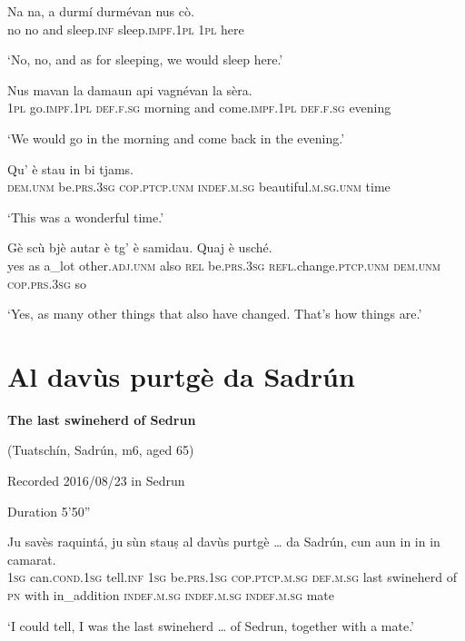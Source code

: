 \begin{linenumbers}
\gll    Na na, a durmí durmévan nus cò. \\
no no and sleep.\textsc{inf} sleep.\textsc{impf.1pl} \textsc{1pl} here \\
\end{linenumbers}
\medskip
\glt `No, no, and as for sleeping, we would sleep here.'
\medskip

\begin{linenumbers}
\gll    Nus mavan la damaun api vagnévan la sèra. \\
 \textsc{1pl} go.\textsc{impf.1pl}  \textsc{def.f.sg} morning and come.\textsc{impf.1pl} \textsc{def.f.sg} evening \\
\end{linenumbers}
\medskip
\glt `We would go in the morning and come back in the evening.'
\medskip

\begin{linenumbers}
\gll    Qu’ è stau in bi tjams. \\
 \textsc{dem.unm} be.\textsc{prs.3sg} \textsc{cop.ptcp.unm} \textsc{indef.m.sg} beautiful.\textsc{m.sg.unm} time\\
\end{linenumbers}
\medskip
\glt `This was a wonderful time.'
\medskip

\largerpage

\begin{linenumbers}
\gll    Gè scù bjè autar è tg’ è samidau. Quaj è usché.\\
yes as a\_lot other.\textsc{adj.unm} also \textsc{rel} be.\textsc{prs.3sg} \textsc{refl.}change.\textsc{ptcp.unm}  \textsc{dem.unm} \textsc{cop.prs.3sg} so\\
\end{linenumbers}
\medskip
\glt `Yes, as many other things that also have changed. That’s how things are.'

\clearpage
\section{Al davùs purtgè da Sadrún}\label{sec:8.11}

\noindent
\textbf{The last swineherd of Sedrun}

\noindent
(Tuatschín, Sadrún, m6, aged 65)

\noindent
Recorded 2016/08/23 in Sedrun

\noindent
Duration 5'50''

\bigskip

\begin{linenumbers}
\gll    Ju savès raquintá, ju sùn stauṣ al davùs purtgè … da Sadrún, cun aun in in in camarat.\\
 \textsc{1sg} can.\textsc{cond.1sg} tell.\textsc{inf} \textsc{1sg} be.\textsc{prs.1sg} \textsc{cop.ptcp.m.sg} \textsc{def.m.sg} last swineherd {} of \textsc{pn} with in\_addition  \textsc{indef.m.sg}  \textsc{indef.m.sg}  \textsc{indef.m.sg} mate\\
\end{linenumbers}
\medskip
\glt `I could tell, I was the last swineherd … of Sedrun, together with a mate.'
\medskip

